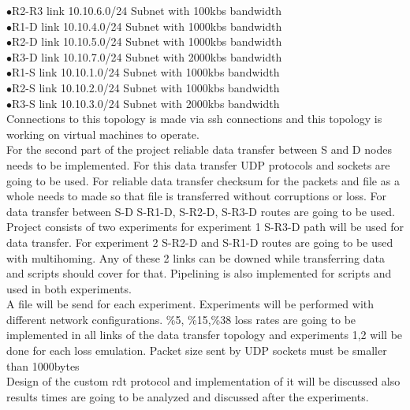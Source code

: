 \documentclass[conference]{IEEEtran}
\begin{document}
$\bullet$R2-R3 link 10.10.6.0/24 Subnet with 100kbs bandwidth\\

$\bullet$R1-D link 10.10.4.0/24 Subnet with 1000kbs bandwidth\\

$\bullet$R2-D link 10.10.5.0/24 Subnet with 1000kbs bandwidth\\

$\bullet$R3-D link 10.10.7.0/24 Subnet with 2000kbs bandwidth\\

$\bullet$R1-S link 10.10.1.0/24 Subnet with 1000kbs bandwidth\\

$\bullet$R2-S link 10.10.2.0/24 Subnet with 1000kbs bandwidth\\

$\bullet$R3-S link 10.10.3.0/24 Subnet with 2000kbs bandwidth\\

Connections to this topology is made via ssh connections and this topology is working on virtual machines to operate.\\


For the second part of the project reliable data transfer between S and D nodes needs to be implemented. For this data transfer UDP protocols and sockets are going to be used. For reliable data transfer checksum for the packets and file as a whole needs to made so that file is transferred without corruptions or loss. For data transfer between S-D S-R1-D, S-R2-D, S-R3-D routes are going to be used. Project consists of two experiments for experiment 1 S-R3-D path will be used for data transfer. For experiment 2 S-R2-D and S-R1-D routes are going to be used with multihoming. Any of these 2 links can be downed while transferring data and scripts should cover for that. Pipelining is also implemented for scripts and used in both experiments.\\

A file will be send for each experiment. Experiments will be performed with different network configurations. \%5, \%15,\%38 loss rates are going to be implemented in all links of the data transfer topology and experiments 1,2 will be done for each loss emulation. Packet size sent by UDP sockets must be smaller than 1000bytes\\ 

Design of the custom rdt protocol and implementation of it will be discussed also results times are going to be analyzed and discussed after the experiments.    \\ \quad \\
\end{document}
